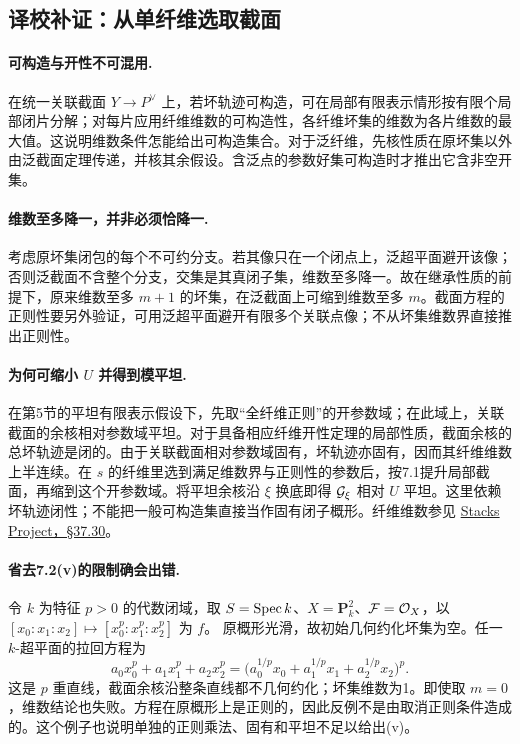 \subsection*{译校补证：从单纤维选取截面}
\paragraph{可构造与开性不可混用.}
在统一关联截面 $Y\to P^\vee$ 上，若坏轨迹可构造，可在局部有限表示情形按有限个局部闭片分解；对每片应用纤维维数的可构造性，各纤维坏集的维数为各片维数的最大值。这说明维数条件怎能给出可构造集合。对于泛纤维，先核性质在原坏集以外由泛截面定理传递，并核其余假设。含泛点的参数好集可构造时才推出它含非空开集。

\paragraph{维数至多降一，并非必须恰降一.}
考虑原坏集闭包的每个不可约分支。若其像只在一个闭点上，泛超平面避开该像；否则泛截面不含整个分支，交集是其真闭子集，维数至多降一。故在继承性质的前提下，原来维数至多 $m+1$ 的坏集，在泛截面上可缩到维数至多 $m$。截面方程的正则性要另外验证，可用泛超平面避开有限多个关联点像；不从坏集维数界直接推出正则性。

\paragraph{为何可缩小 $U$ 并得到模平坦.}
在第5节的平坦有限表示假设下，先取“全纤维正则”的开参数域；在此域上，关联截面的余核相对参数域平坦。对于具备相应纤维开性定理的局部性质，截面余核的总坏轨迹是闭的。由于关联截面相对参数域固有，坏轨迹亦固有，因而其纤维维数上半连续。在 $s$ 的纤维里选到满足维数界与正则性的参数后，按7.1提升局部截面，再缩到这个开参数域。将平坦余核沿 $\xi$ 换底即得 $\mathcal G_\xi$ 相对 $U$ 平坦。这里依赖坏轨迹闭性；不能把一般可构造集直接当作固有闭子概形。纤维维数参见 \href{https://stacks.math.columbia.edu/tag/05F6}{Stacks Project，§37.30}。

\paragraph{省去7.2(v)的限制确会出错.}
令 $k$ 为特征 $p>0$ 的代数闭域，取 $S=\operatorname{Spec} k$、$X=\mathbf P_k^2$、$\mathcal F=\mathcal O_X$，以
$[x_0:x_1:x_2]\mapsto[x_0^p:x_1^p:x_2^p]$ 为 $f$。
原概形光滑，故初始几何约化坏集为空。任一 $k$-超平面的拉回方程为
\[
 a_0x_0^p+a_1x_1^p+a_2x_2^p
   =\bigl(a_0^{1/p}x_0+a_1^{1/p}x_1+a_2^{1/p}x_2\bigr)^p .
\]
这是 $p$ 重直线，截面余核沿整条直线都不几何约化；坏集维数为1。即使取 $m=0$，维数结论也失败。方程在原概形上是正则的，因此反例不是由取消正则条件造成的。这个例子也说明单独的正则乘法、固有和平坦不足以给出(v)。

